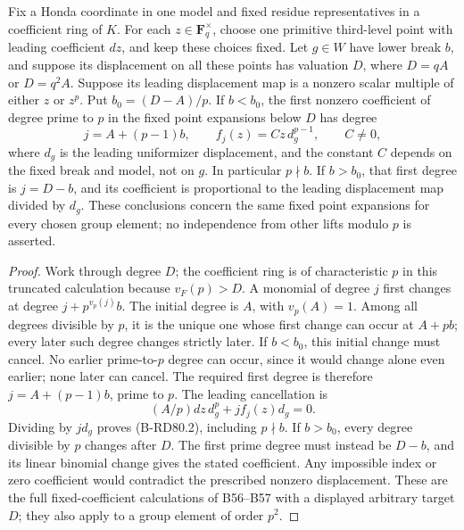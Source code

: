 \begin{lemma}
\label{lem:B-RD80-first}
Fix a Honda coordinate in one model and fixed residue representatives
in a coefficient ring of \(K\). For each \(z\in\mathbf F_q^\times\),
choose one primitive third-level point with leading coefficient \(dz\),
and keep these choices fixed. Let \(g\in W\) have lower break \(b\),
and suppose its displacement on all these points has valuation
\(D\), where \(D=qA\) or \(D=q^2A\). Suppose its leading displacement
map is a nonzero scalar multiple of either \(z\) or \(z^p\).
Put \(b_0=(D-A)/p\).
If \(b<b_0\), the first nonzero coefficient of degree prime to \(p\)
in the fixed point expansions below \(D\) has degree
\[
             j=A+(p-1)b,
 \qquad f_j(z)=Cz\,d_g^{p-1},\qquad C\ne0,           \tag{B-RD80.2}
\]
where \(d_g\) is the leading uniformizer displacement, and the
constant \(C\) depends on the fixed break and model, not on \(g\).
In particular \(p\nmid b\).
If \(b>b_0\), that first degree is \(j=D-b\), and its coefficient
is proportional to the leading displacement map divided by \(d_g\).
These conclusions concern the same fixed point expansions for every
chosen group element; no independence from other lifts modulo \(p\)
is asserted.
\end{lemma}
\begin{proof}
Work through degree \(D\); the coefficient ring is of characteristic
\(p\) in this truncated calculation because \(v_F(p)>D\).
A monomial of degree \(j\) first changes at degree
\(j+p^{v_p(j)}b\). The initial degree is \(A\), with \(v_p(A)=1\).
Among all degrees divisible by \(p\), it is the unique one whose
first change can occur at \(A+pb\); every later such degree changes
strictly later. If \(b<b_0\), this initial change must cancel.
No earlier prime-to-\(p\) degree can occur, since it would change
alone even earlier; none later can cancel. The required first degree
is therefore \(j=A+(p-1)b\), prime to \(p\). The leading cancellation is
\[
       (A/p)dz\,d_g^p+jf_j(z)d_g=0.
\]
Dividing by \(jd_g\) proves (B-RD80.2), including \(p\nmid b\).
If \(b>b_0\), every degree divisible by \(p\) changes after \(D\).
The first prime degree must instead be \(D-b\), and its linear
binomial change gives the stated coefficient. Any impossible
index or zero coefficient would contradict the prescribed nonzero
displacement. These are the full fixed-coefficient calculations of
B56--B57 with a displayed arbitrary target \(D\); they also apply
to a group element of order \(p^2\).
\end{proof}

